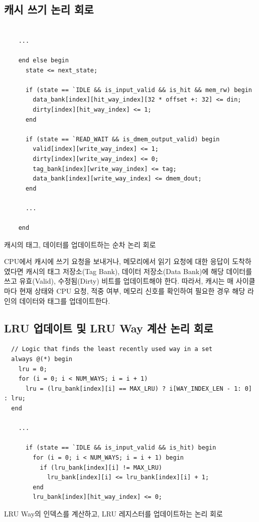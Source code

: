 \documentclass[openright, a4paper]{article}
\newenvironment{longlisting}{\captionsetup{type=listing}}{}
\begin{document}
\subsection{캐시 쓰기 논리 회로}

\hfill

\begin{longlisting}
    \begin{verbatim}

    ...

    end else begin
      state <= next_state;

      if (state == `IDLE && is_input_valid && is_hit && mem_rw) begin
        data_bank[index][hit_way_index][32 * offset +: 32] <= din;
        dirty[index][hit_way_index] <= 1;
      end 
      
      if (state == `READ_WAIT && is_dmem_output_valid) begin
        valid[index][write_way_index] <= 1;
        dirty[index][write_way_index] <= 0;
        tag_bank[index][write_way_index] <= tag;
        data_bank[index][write_way_index] <= dmem_dout;
      end

      ...

    end
    \end{verbatim}
    \caption{캐시의 태그, 데이터를 업데이트하는 순차 논리 회로}
\end{longlisting}

\hfill

CPU에서 캐시에 쓰기 요청을 보내거나, 메모리에서 읽기 요청에 대한 응답이
도착하였다면 캐시의 태그 저장소(Tag Bank), 데이터 저장소(Data Bank)에 해당 
데이터를 쓰고 유효(Valid), 수정됨(Dirty) 비트를 업데이트해야 한다. 따라서, 캐시는
매 사이클마다 현재 상태와 CPU 요청, 적중 여부, 메모리 신호를 확인하여 필요한 경우
해당 라인의 데이터와 태그를 업데이트한다.

\subsection{LRU 업데이트 및 LRU Way 계산 논리 회로}

\hfill

\begin{longlisting}
    \begin{verbatim}
  // Logic that finds the least recently used way in a set 
  always @(*) begin
    lru = 0;
    for (i = 0; i < NUM_WAYS; i = i + 1)
      lru = (lru_bank[index][i] == MAX_LRU) ? i[WAY_INDEX_LEN - 1: 0] : lru;
  end

    ...

      if (state == `IDLE && is_input_valid && is_hit) begin
        for (i = 0; i < NUM_WAYS; i = i + 1) begin
          if (lru_bank[index][i] != MAX_LRU)
            lru_bank[index][i] <= lru_bank[index][i] + 1;
        end
        lru_bank[index][hit_way_index] <= 0;
    \end{verbatim}
    \caption{LRU Way의 인덱스를 계산하고, LRU 레지스터를 업데이트하는 논리 회로}
\end{longlisting}
\end{document}
